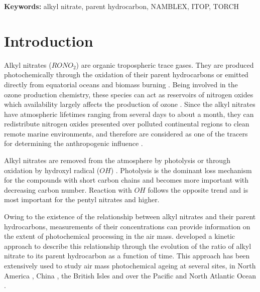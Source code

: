 \documentclass[11pt,a4paper]{article}
\title{\mytitle}
\begin{document}
\maketitle

\begin{abstract}
This work is based on alkyl nitrate measurements from four field campaigns, from ground-based sites across the British Isles and aircraft measurements over the North Atlantic. The ratios between the alkyl nitrates and their parent hydrocarbons are compared with those expected from the photochemical theory. The sensitivity analysis to the theoretical assumptions and uncertainties in measurements revealed a good general agreement between observed and theoretical data.
\end{abstract}
\smallskip
\noindent \textbf{Keywords:} alkyl nitrate, parent hydrocarbon, NAMBLEX, ITOP, TORCH

\section{Introduction} \label{sec:intro}
Alkyl nitrates ($RONO_2$) are organic tropospheric trace gases. They are produced photochemically through the oxidation of their parent hydrocarbons \citep{Roberts1990} or emitted directly from equatorial oceans \citep{Blake2003} and biomass burning \citep{Simpson2002}. Being involved in the ozone production chemistry, these species can act as reservoirs of nitrogen oxides which availability largely affects the production of ozone \citep{Reeves2007}. Since the alkyl nitrates have atmospheric lifetimes ranging from several days to about a month, they can redistribute nitrogen oxides presented over polluted continental regions to clean remote marine environments, and therefore are considered as one of the tracers for determining the anthropogenic influence \citep{Atherton1989, Reeves2007, Worton2005}.

Alkyl nitrates are removed from the atmosphere by photolysis \citep{Turberg1990} or through oxidation by hydroxyl radical ($OH$) \citep{Talukdar1997}. Photolysis is the dominant loss mechanism for the compounds with short carbon chains and becomes more important with decreasing carbon number. Reaction with $OH$ follows the opposite trend and is most important for the pentyl nitrates and higher.

Owing to the existence of the relationship between alkyl nitrates and their parent hydrocarbons, measurements of their concentrations can provide information on the extent of photochemical processing in the air mass. \cite{Bertman1995} developed a kinetic approach to describe this relationship through the evolution of the ratio of alkyl nitrate to its parent hydrocarbon as a function of time. This approach has been extensively used to study air mass photochemical ageing at several sites, in North America \citep{Bertman1995, Roberts1998}, China \citep{Simpson2006}, the British Isles \citep{Worton2010} and over the Pacific \citep{Simpson2003} and North Atlantic Ocean \citep{Reeves2007}.
\end{document}
